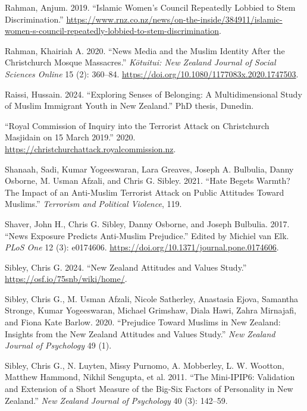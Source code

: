 \documentclass[
]{interact}
\newlength{\cslhangindent}
\newenvironment{CSLReferences}[2] %
 {\begin{list}{}{%
  \setlength{\itemindent}{0pt}
  \setlength{\leftmargin}{0pt}
  \setlength{\parsep}{0pt}
  \ifodd #1
   \setlength{\leftmargin}{\cslhangindent}
   \setlength{\itemindent}{-1\cslhangindent}
  \fi
  \setlength{\itemsep}{#2\baselineskip}}}
 {\end{list}}
\begin{document}
\begin{CSLReferences}{1}{0}
Rahman, Anjum. 2019. {``Islamic {W}omen's {C}ouncil Repeatedly Lobbied
to Stem Discrimination.''}
\url{https://www.rnz.co.nz/news/on-the-inside/384911/islamic-women-s-council-repeatedly-lobbied-to-stem-discrimination}.

Rahman, Khairiah A. 2020. {``News Media and the Muslim Identity After
the Christchurch Mosque Massacres.''} \emph{K{ō}tuitui: New Zealand
Journal of Social Sciences Online} 15 (2): 360--84.
\url{https://doi.org/10.1080/1177083x.2020.1747503}.

Raissi, Hussain. 2024. {``Exploring Senses of Belonging: {A}
Multidimensional Study of {M}uslim Immigrant Youth in {N}ew
{Z}ealand.''} PhD thesis, Dunedin.

{``Royal {C}ommission of {I}nquiry into the Terrorist Attack on
{C}hristchurch {M}asjidain on 15 {M}arch 2019.''} 2020.
\url{https://christchurchattack.royalcommission.nz}.

Shanaah, Sadi, Kumar Yogeeswaran, Lara Greaves, Joseph A. Bulbulia,
Danny Osborne, M. Usman Afzali, and Chris G. Sibley. 2021. {``Hate
Begets Warmth? The Impact of an Anti-{M}uslim Terrorist Attack on Public
Attitudes Toward {M}uslims.''} \emph{Terrorism and Political Violence},
119.

Shaver, John H., Chris G. Sibley, Danny Osborne, and Joseph Bulbulia.
2017. {``News Exposure Predicts Anti-Muslim Prejudice.''} Edited by
Michiel van Elk. \emph{PLoS One} 12 (3): e0174606.
\url{https://doi.org/10.1371/journal.pone.0174606}.

Sibley, Chris G. 2024. {``New Zealand Attitudes and Values Study.''}
\url{https://osf.io/75snb/wiki/home/}.

Sibley, Chris G., M. Usman Afzali, Nicole Satherley, Anastasia Ejova,
Samantha Stronge, Kumar Yogeeswaran, Michael Grimshaw, Diala Hawi, Zahra
Mirnajafi, and Fiona Kate Barlow. 2020. {``Prejudice Toward {M}uslims in
{N}ew {Z}ealand: Insights from the {N}ew {Z}ealand {A}ttitudes and
{V}alues {S}tudy.''} \emph{New Zealand Journal of Psychology} 49 (1).

Sibley, Chris G., N. Luyten, Missy Purnomo, A. Mobberley, L. W. Wootton,
Matthew Hammond, Nikhil Sengupta, et al. 2011. {``The Mini-IPIP6:
Validation and Extension of a Short Measure of the {B}ig-{S}ix Factors
of Personality in {N}ew {Z}ealand.''} \emph{New Zealand Journal of
Psychology} 40 (3): 142--59.


\end{CSLReferences}
\end{document}
